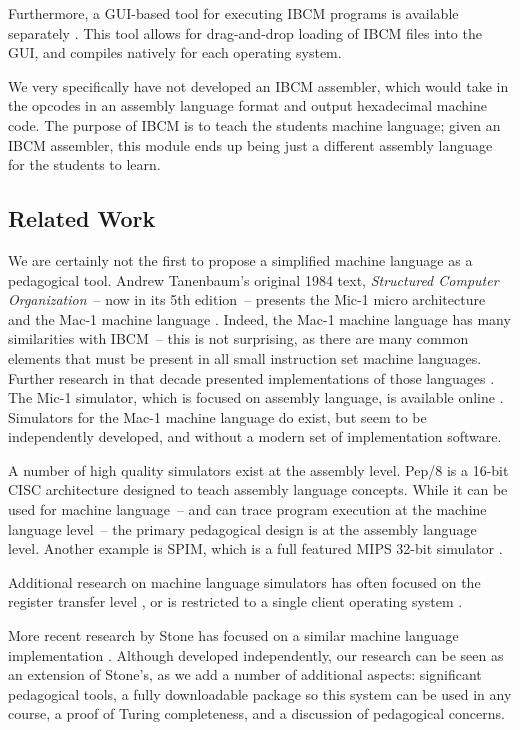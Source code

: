 Furthermore, a GUI-based tool for executing IBCM programs is available
separately \cite{jwelsh-ibcm}.
This tool allows for drag-and-drop loading of IBCM files into the
GUI, and compiles natively for each operating system.


We very specifically have not developed an IBCM assembler, which would
take in the opcodes in an assembly language format and output
hexadecimal machine code.  The purpose of IBCM is to teach the
students machine language; given an IBCM assembler, this module ends
up being just a different assembly language for the students to learn.

\subsection{Related Work}

We are certainly not the first to propose a simplified machine
language as a pedagogical tool.  Andrew Tanenbaum's original 1984
text, {\em Structured Computer Organization}~-- now in its 5th
edition~-- presents the Mic-1 micro architecture and the Mac-1 machine
language \cite{538160}.  Indeed, the Mac-1 machine language has many
similarities with IBCM~-- this is not surprising, as there are many
common elements that must be present in all small instruction set
machine languages.  Further research in that decade presented
implementations of those languages \cite{54147,152757}.  The Mic-1
simulator, which is focused on assembly language, is available online
\cite{mic-1-website}.  Simulators for the Mac-1 machine language do
exist, but seem to be independently developed, and without a modern
set of implementation software.

A number of high quality simulators exist at the assembly level.
Pep/8 \cite{warford:2010:PMT:1734263.1734389,warford2009computer} is a
16-bit CISC architecture designed to teach assembly language concepts.
While it can be used for machine language~-- and can trace program
execution at the machine language level~-- the primary pedagogical
design is at the assembly language level. Another example is SPIM,
which is a full featured MIPS 32-bit simulator \cite{spim-website}.

Additional research on machine language simulators has often focused
on the register transfer level \cite{107081}, or is restricted to a
single client operating system \cite{199795}.

More recent research by Stone has focused on a similar machine
language implementation \cite{1189166}.  Although developed
independently, our research can be seen as an extension of Stone's, as
we add a number of additional aspects: significant pedagogical tools,
a fully downloadable package so this system can be used in any course,
a proof of Turing completeness, and a discussion of pedagogical
concerns.

